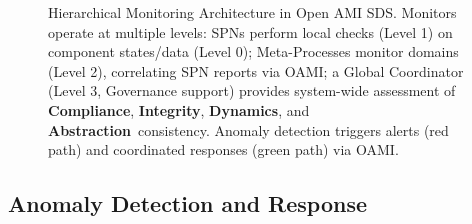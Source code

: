 \documentclass[12pt,a4paper]{report}
\newcommand{\Integrity}{\textbf{Integrity}}
\newcommand{\Abstraction}{\textbf{Abstraction}}
\newcommand{\Dynamics}{\textbf{Dynamics}}
\begin{document}
\begin{figure}[ht]
		\caption[Hierarchical Monitoring Architecture]{Hierarchical Monitoring Architecture in Open AMI SDS. Monitors operate at multiple levels: SPNs perform local checks (Level 1) on component states/data (Level 0); Meta-Processes monitor domains (Level 2), correlating SPN reports via OAMI; a Global Coordinator (Level 3, Governance support) provides system-wide assessment of \textbf{Compliance}, \Integrity, \Dynamics, and \Abstraction\ consistency. Anomaly detection triggers alerts (red path) and coordinated responses (green path) via OAMI.}
		\label{fig:monitoring-architecture}
	\end{figure}
	
	\subsection{Anomaly Detection and Response} %
	\label{sec:4-5-2} %
	
\end{document}
